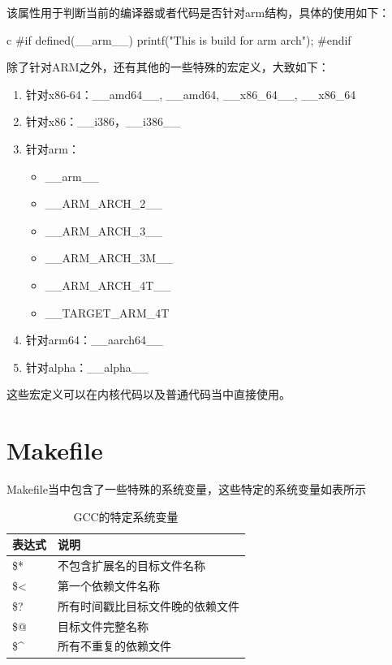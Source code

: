 \begin{outline}[enumerate]
该属性用于判断当前的编译器或者代码是否针对arm结构，具体的使用如下：
\begin{code-block}{c}
#if defined(__arm__)
        printf("This is build for arm arch\n");
#endif
\end{code-block}
除了针对ARM之外，还有其他的一些特殊的宏定义，大致如下：
\begin{enumerate}
  \item 针对x86-64：\_\_amd64\_\_, \_\_amd64, \_\_x86\_64\_\_, \_\_x86\_64
  \item 针对x86：\_\_i386，\_\_i386\_\_
  \item 针对arm：
  \begin{itemize}
  \item \_\_arm\_\_
  \item \_\_ARM\_ARCH\_2\_\_
  \item \_\_ARM\_ARCH\_3\_\_
  \item \_\_ARM\_ARCH\_3M\_\_
  \item \_\_ARM\_ARCH\_4T\_\_
  \item \_\_TARGET\_ARM\_4T
  \end{itemize}
  \item 针对arm64：\_\_aarch64\_\_
  \item 针对alpha：\_\_alpha\_\_
\end{enumerate}
这些宏定义可以在内核代码以及普通代码当中直接使用。

\end{outline}

\section{Makefile}
Makefile当中包含了一些特殊的系统变量，这些特定的系统变量如表所示
\begin{table}[H]
  \caption{GCC的特定系统变量}
  \label{tab:macro_of_makefile}
  \begin{tabularx}{\textwidth}{|X|X|}
  \hline
  \centering 表达式& \centering\arraybackslash 说明\\ \hline
  \centering \$* & 不包含扩展名的目标文件名称 \\
  \centering \$< & 第一个依赖文件名称\\
  \centering \$? & 所有时间戳比目标文件晚的依赖文件\\
  \centering \$@ & 目标文件完整名称\\
  \centering \$\^{} & 所有不重复的依赖文件\\ \hline
  \end{tabularx}
\end{table}

